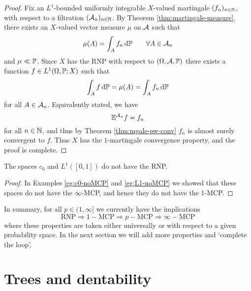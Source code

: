 \begin{proof}
  Fix an $L^1$-bounded uniformly integrable $X$-valued martingale $(f_n)_{n \in \N}$, with respect to a filtration $(\mc{A}_{n})_{n \in \N}$.
  By Theorem \ref{thm:martingale-measure}, there exists an $X$-valued vector measure $\mu$ on $\mc{A}$ such that
  \begin{equation*}
    \mu(A) = \int_{A} f_n \, \dd\P \qquad \forall A \in \mc{A}_n
  \end{equation*}
  and $\mu \ll \P$.
  Since $X$ has the RNP with respect to $(\Omega,\mc{A},\P)$ there exists a function $f \in L^1(\Omega,\P;X)$ such that
  \begin{equation*}
    \int_{A} f \, \dd\P = \mu(A) = \int_A f_n \, \dd\P
  \end{equation*}
  for all $A \in \mc{A}_n$.
  Equivalently stated, we have
  \begin{equation*}
    \E^{\mc{A}_n} f = f_n
  \end{equation*}
  for all $n \in \N$, and thus by Theorem \ref{thm:mgale-pw-conv} $f_n$ is almost surely convergent to $f$.
  Thus $X$ has the $1$-martingale convergence property, and the proof is complete.
\end{proof}

\begin{cor}
  The spaces $c_0$ and $L^1([0,1])$ do not have the RNP.
\end{cor}

\begin{proof}
  In Examples \ref{eg:c0-noMCP} and \ref{eg:L1-noMCP} we showed that these spaces do not have the $\infty$-MCP, and hence they do not have the $1$-MCP. 
\end{proof}

In summary, for all $p \in (1,\infty]$ we currently have the implications
\begin{equation*}
  \mathrm{RNP} \Longrightarrow 1-\mathrm{MCP} \Longrightarrow p-\mathrm{MCP} \Longrightarrow \infty-\mathrm{MCP}
\end{equation*}
where these properties are taken either universally or with respect to a given probability space.
In the next section we will add more properties and `complete the loop'.

\section{Trees and dentability}

